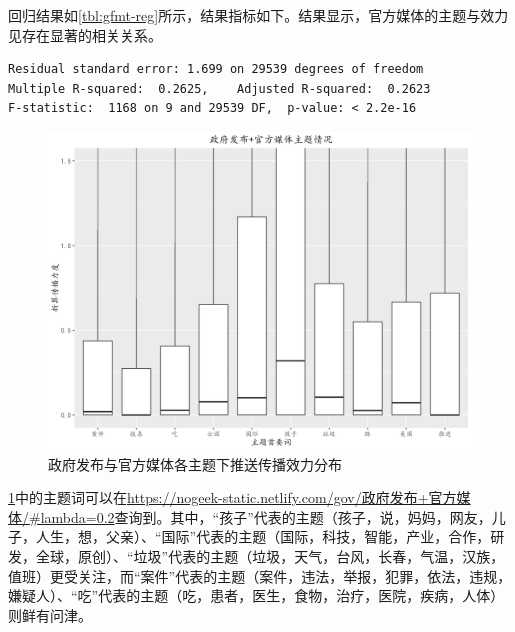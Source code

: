 \documentclass[a4paper,12pt,UTF8]{article}
\begin{document}
    回归结果如\cref{tbl:gfmt-reg}所示，结果指标如下。结果显示，官方媒体的主题与效力见存在显著的相关关系。
    \begin{lstlisting}
Residual standard error: 1.699 on 29539 degrees of freedom
Multiple R-squared:  0.2625,	Adjusted R-squared:  0.2623 
F-statistic:  1168 on 9 and 29539 DF,  p-value: < 2.2e-16
    \end{lstlisting}
    
    \begin{figure}[htbp]
      \centering
      \includegraphics[width=0.9\linewidth]{政府发布+官方媒体.png}
      \caption{政府发布与官方媒体各主题下推送传播效力分布}
      \label{fig:zffbgfmt-box}
    \end{figure}
    \cref{fig:zffbgfmt-box}中的主题词可以在\url{https://nogeek-static.netlify.com/gov/政府发布+官方媒体/#lambda=0.2}查询到。其中，“孩子”代表的主题（孩子，说，妈妈，网友，儿子，人生，想，父亲）、“国际”代表的主题（国际，科技，智能，产业，合作，研发，全球，原创）、“垃圾”代表的主题（垃圾，天气，台风，长春，气温，汉族，值班）更受关注，而“案件”代表的主题（案件，违法，举报，犯罪，依法，违规，嫌疑人）、“吃”代表的主题（吃，患者，医生，食物，治疗，医院，疾病，人体）则鲜有问津。
\end{document}
